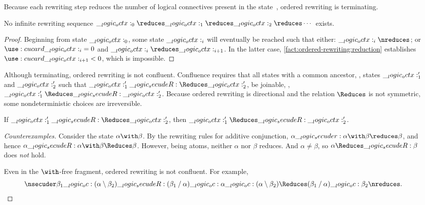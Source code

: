 Because each rewriting step reduces the number of logical connectives present in the state~, ordered rewriting is terminating.
%
\begin{theorem}[Termination]
  No infinite rewriting sequence $\octx_0 \reduces \octx_1 \reduces \octx_2 \reduces \dotsb$ exists.
\end{theorem}
%
\begin{proof}
  Beginning from state $\__logic_octx:_0$, some state $\__logic_octx:_i$ will eventually be reached such that either: $\octx_i \nreduces$; or $\card{\octx_i} = 0$ and $\octx_i \reduces \octx_{i+1}$.
  In the latter case, \cref{fact:ordered-rewriting:reduction} establishes $\card{\octx_{i+1}} < 0$, which is impossible.
\end{proof}

Although terminating, ordered rewriting is not confluent.
Confluence requires that all states with a common ancestor, \ie, states $\__logic_octx:'_1$ and $\__logic_octx:'_2$ such that $\octx'_1 \secudeR\Reduces \octx'_2$, be joinable, \ie, $\octx'_1 \Reduces\secudeR \octx'_2$.
Because ordered rewriting is directional and the relation $\Reduces$ is not symmetric, some nondeterministic choices are irreversible.%
%
\begin{falseclaim}[Confluence]
  If\/ $\octx'_1 \secudeR\Reduces \octx'_2$, then $\octx'_1 \Reduces\secudeR \octx'_2$.
\end{falseclaim}
%
\begin{proof}[Counterexamples]
  Consider the state $\alpha \with \beta$.
  By the rewriting rules for additive conjunction, $\alpha \secuder \alpha \with \beta \reduces \beta$, and hence $\alpha \secudeR \alpha \with \beta \Reduces \beta$.
  However, being atoms, neither $\alpha$ nor $\beta$ reduces.
  And $\alpha \neq \beta$, so $\alpha \Reduces\secudeR \beta$ does \emph{not} hold.

  Even in the $\with$-free fragment, ordered rewriting is not confluent.
  For example,
  \begin{equation*}
    \nsecuder \beta_1 \oc (\alpha \limp \beta_2) \secudeR (\beta_1 \pmir \alpha) \oc \alpha \oc (\alpha \limp \beta_2) \Reduces (\beta_1 \pmir \alpha) \oc \beta_2 \nreduces
    .
    \qedhere
  \end{equation*}
\end{proof}


